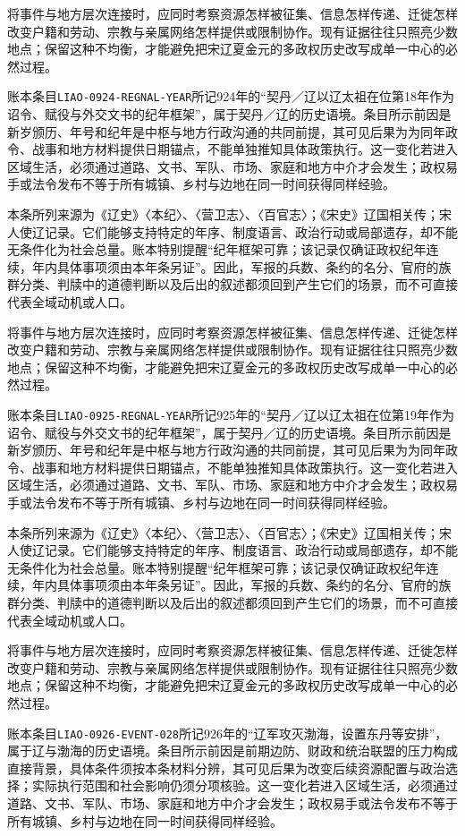 将事件与地方层次连接时，应同时考察资源怎样被征集、信息怎样传递、迁徙怎样改变户籍和劳动、宗教与亲属网络怎样提供或限制协作。现有证据往往只照亮少数地点；保留这种不均衡，才能避免把宋辽夏金元的多政权历史改写成单一中心的必然过程。

账本条目\texttt{LIAO-0924-REGNAL-YEAR}所记924年的“契丹／辽以辽太祖在位第18年作为诏令、赋役与外交文书的纪年框架”，属于契丹／辽的历史语境。条目所示前因是新岁颁历、年号和纪年是中枢与地方行政沟通的共同前提，其可见后果为为同年政令、战事和地方材料提供日期锚点，不能单独推知具体政策执行。这一变化若进入区域生活，必须通过道路、文书、军队、市场、家庭和地方中介才会发生；政权易手或法令发布不等于所有城镇、乡村与边地在同一时间获得同样经验。

本条所列来源为《辽史》〈本纪〉、〈营卫志〉、〈百官志〉；《宋史》辽国相关传；宋人使辽记录。它们能够支持特定的年序、制度语言、政治行动或局部遗存，却不能无条件化为社会总量。账本特别提醒“纪年框架可靠；该记录仅确证政权纪年连续，年内具体事项须由本年条另证”。因此，军报的兵数、条约的名分、官府的族群分类、判牍中的道德判断以及后出的叙述都须回到产生它们的场景，而不可直接代表全域动机或人口。

将事件与地方层次连接时，应同时考察资源怎样被征集、信息怎样传递、迁徙怎样改变户籍和劳动、宗教与亲属网络怎样提供或限制协作。现有证据往往只照亮少数地点；保留这种不均衡，才能避免把宋辽夏金元的多政权历史改写成单一中心的必然过程。

账本条目\texttt{LIAO-0925-REGNAL-YEAR}所记925年的“契丹／辽以辽太祖在位第19年作为诏令、赋役与外交文书的纪年框架”，属于契丹／辽的历史语境。条目所示前因是新岁颁历、年号和纪年是中枢与地方行政沟通的共同前提，其可见后果为为同年政令、战事和地方材料提供日期锚点，不能单独推知具体政策执行。这一变化若进入区域生活，必须通过道路、文书、军队、市场、家庭和地方中介才会发生；政权易手或法令发布不等于所有城镇、乡村与边地在同一时间获得同样经验。

本条所列来源为《辽史》〈本纪〉、〈营卫志〉、〈百官志〉；《宋史》辽国相关传；宋人使辽记录。它们能够支持特定的年序、制度语言、政治行动或局部遗存，却不能无条件化为社会总量。账本特别提醒“纪年框架可靠；该记录仅确证政权纪年连续，年内具体事项须由本年条另证”。因此，军报的兵数、条约的名分、官府的族群分类、判牍中的道德判断以及后出的叙述都须回到产生它们的场景，而不可直接代表全域动机或人口。

将事件与地方层次连接时，应同时考察资源怎样被征集、信息怎样传递、迁徙怎样改变户籍和劳动、宗教与亲属网络怎样提供或限制协作。现有证据往往只照亮少数地点；保留这种不均衡，才能避免把宋辽夏金元的多政权历史改写成单一中心的必然过程。

账本条目\texttt{LIAO-0926-EVENT-028}所记926年的“辽军攻灭渤海，设置东丹等安排”，属于辽与渤海的历史语境。条目所示前因是前期边防、财政和统治联盟的压力构成直接背景，具体条件须按本条材料分辨，其可见后果为改变后续资源配置与政治选择；实际执行范围和社会影响仍须分项核验。这一变化若进入区域生活，必须通过道路、文书、军队、市场、家庭和地方中介才会发生；政权易手或法令发布不等于所有城镇、乡村与边地在同一时间获得同样经验。

